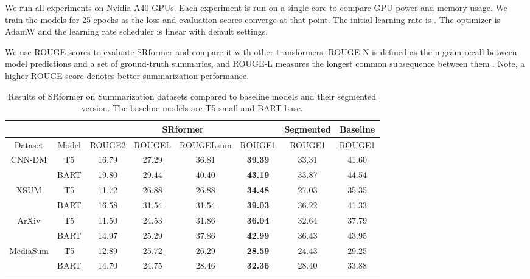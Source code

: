 \documentclass[11pt]{article}
\begin{document}
We run all experiments on Nvidia A40 GPUs. Each experiment is run on a single core to compare GPU power and memory usage. We train the models for 25 epochs as the loss and evaluation scores converge at that point. The initial learning rate is . The optimizer is AdamW and the learning rate scheduler is linear with default settings.

We use ROUGE scores to evaluate SRformer and compare it with other transformers. ROUGE-N is defined as the n-gram recall between model predictions and a set of ground-truth summaries, and ROUGE-L measures the longest common subsequence between them \citep{lin-2004-rouge}. Note, a higher ROUGE score denotes better summarization performance.

\begin{table*}[htbp]
    \centering
    \begin{tabular}{c|c|c|c|c|c|c|c}
       \hline
      & & \multicolumn{4}{c|}{\textbf{SRformer}} & \textbf{Segmented} & \textbf{Baseline}\\
       \hline
        Dataset & Model &    ROUGE2 &  ROUGEL &  ROUGELsum  & ROUGE1 & ROUGE1 & ROUGE1\\
       \hline
       \multirow{2}{*}{CNN-DM} & T5  & 16.79 & 27.29 & 36.81 &  \textbf{39.39} & 33.31  & 41.60\\
        & BART  & 19.80 & 29.44 & 40.40 &  \textbf{43.19} & 33.87 & 44.54\\
        \multirow{2}{*}{XSUM} & T5&   11.72 & 26.88 &  26.88 & \textbf{34.48} & 27.03 & 35.35\\
        & BART&   16.58 & 31.54&  31.54 & \textbf{39.03} & 36.22 & 41.33\\
        \multirow{2}{*}{ ArXiv} & T5&   11.50 & 24.53& 31.86 & \textbf{36.04} & 32.64 & 37.79 \\
        & BART & 14.97 & 25.29 & 37.86 & \textbf{42.99}& 36.43 & 43.95\\
        \multirow{2}{*}{MediaSum} & T5&   12.89 & 25.72 &  26.29& \textbf{28.59} &24.43& 29.25 \\
        & BART& 14.70   & 24.75 & 28.46 & \textbf{32.36} & 28.40 & 33.88 \\
       \hline
    \end{tabular}
    \caption{Results of SRformer on Summarization datasets compared to baseline models and their segmented version. The baseline models are T5-small and BART-base. }
    \label{tab:sum}
\end{table*}
\end{document}
